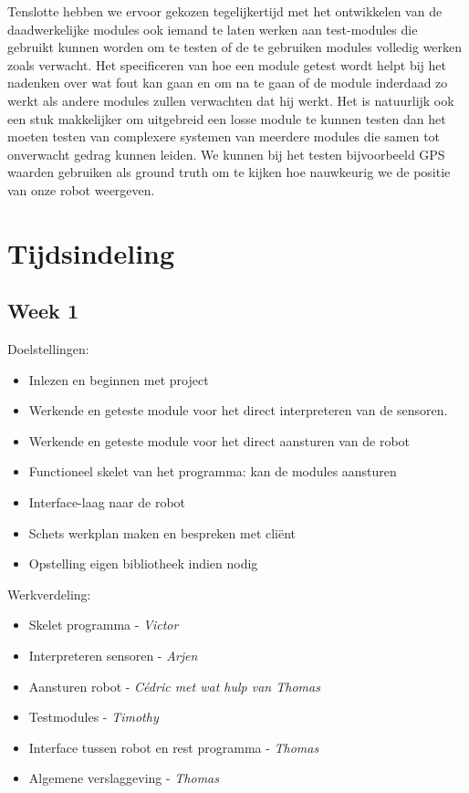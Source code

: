 \documentclass[a4paper, 11pt]{article}
\begin{document}
  
  Tenslotte hebben we ervoor gekozen tegelijkertijd met het ontwikkelen van de daadwerkelijke modules ook iemand
  te laten werken aan test-modules die gebruikt kunnen worden om te testen of de te gebruiken modules volledig
  werken zoals verwacht. Het specificeren van hoe een module getest wordt helpt bij het nadenken over wat fout
  kan gaan en om na te gaan of de module inderdaad zo werkt als andere modules zullen verwachten dat hij werkt.
  Het is natuurlijk ook een stuk makkelijker om uitgebreid een losse module te kunnen testen dan het moeten testen
  van complexere systemen van meerdere modules die samen tot onverwacht gedrag kunnen leiden. We kunnen bij het
  testen bijvoorbeeld GPS waarden gebruiken als ground truth om te kijken hoe nauwkeurig we de positie van onze
  robot weergeven.

  \clearpage
\section*{Tijdsindeling}
  \subsection*{Week 1}
    Doelstellingen:
    \begin{itemize}
        \item Inlezen en beginnen met project
	\item Werkende en geteste module voor het direct interpreteren van de sensoren.
	\item Werkende en geteste module voor het direct aansturen van de robot
	\item Functioneel skelet van het programma: kan de modules aansturen
	\item Interface-laag naar de robot
	\item Schets werkplan maken en bespreken met cli\"ent
	\item Opstelling eigen bibliotheek indien nodig
    \end{itemize}
    Werkverdeling:
    \begin{itemize}
        \item Skelet programma - \emph{Victor}
        \item Interpreteren sensoren - \emph{Arjen}
        \item Aansturen robot - \emph{C\'edric met wat hulp van Thomas}
        \item Testmodules - \emph{Timothy}
        \item Interface tussen robot en rest programma - \emph{Thomas}
        \item Algemene verslaggeving - \emph{Thomas}
    \end{itemize}
    
\end{document}

